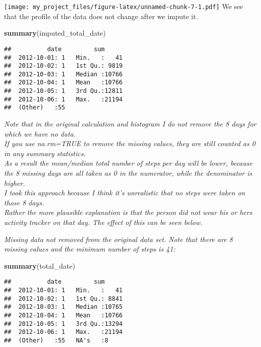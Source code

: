 \documentclass[]{article}
\newenvironment{Shaded}{\begin{snugshade}}{\end{snugshade}}
\newcommand{\KeywordTok}[1]{\textcolor[rgb]{0.13,0.29,0.53}{\textbf{#1}}}
\newcommand{\NormalTok}[1]{#1}
\begin{document}
\texttt{[image: my\_project\_files/figure-latex/unnamed-chunk-7-1.pdf]} We
see that the profile of the data does not change after we impute it.

\begin{Shaded}
\begin{Highlighting}[]
\KeywordTok{summary}\NormalTok{(imputed_total_date)}
\end{Highlighting}
\end{Shaded}

\begin{verbatim}
##          date         sum       
##  2012-10-01: 1   Min.   :   41  
##  2012-10-02: 1   1st Qu.: 9819  
##  2012-10-03: 1   Median :10766  
##  2012-10-04: 1   Mean   :10766  
##  2012-10-05: 1   3rd Qu.:12811  
##  2012-10-06: 1   Max.   :21194  
##  (Other)   :55
\end{verbatim}

\emph{Note that in the original calculation and histogram I do not
remove the 8 days for which we have no data.}\\
\emph{If you use na.rm=TRUE to remove the missing values, they are still
counted as 0 in any summary statistics.}\\
\emph{As a result the mean/median total number of steps per day will be
lower, because the 8 missing days are all taken as 0 in the numerator,
while the denominator is higher.}\\
\emph{I took this approach because I think it's unrealistic that no
steps were taken on those 8 days.}\\
\emph{Rather the more plausible explanation is that the person did not
wear his or hers activity tracker on that day. The effect of this can be
seen below.}

\emph{Missing data not removed from the original data set. Note that
there are 8 missing values and the minimum number of steps is 41:}

\begin{Shaded}
\begin{Highlighting}[]
\KeywordTok{summary}\NormalTok{(total_date)}
\end{Highlighting}
\end{Shaded}

\begin{verbatim}
##          date         sum       
##  2012-10-01: 1   Min.   :   41  
##  2012-10-02: 1   1st Qu.: 8841  
##  2012-10-03: 1   Median :10765  
##  2012-10-04: 1   Mean   :10766  
##  2012-10-05: 1   3rd Qu.:13294  
##  2012-10-06: 1   Max.   :21194  
##  (Other)   :55   NA's   :8
\end{verbatim}
\end{document}
